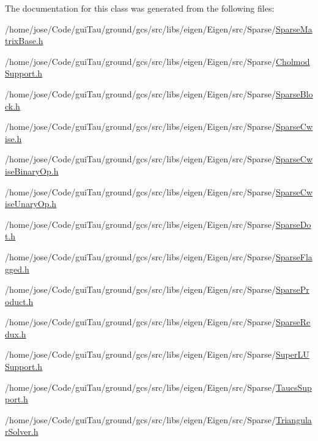 The documentation for this class was generated from the following files\-:\begin{DoxyCompactItemize}
\item 
/home/jose/\-Code/gui\-Tau/ground/gcs/src/libs/eigen/\-Eigen/src/\-Sparse/\hyperlink{_sparse_matrix_base_8h}{Sparse\-Matrix\-Base.\-h}\item 
/home/jose/\-Code/gui\-Tau/ground/gcs/src/libs/eigen/\-Eigen/src/\-Sparse/\hyperlink{_cholmod_support_8h}{Cholmod\-Support.\-h}\item 
/home/jose/\-Code/gui\-Tau/ground/gcs/src/libs/eigen/\-Eigen/src/\-Sparse/\hyperlink{_sparse_block_8h}{Sparse\-Block.\-h}\item 
/home/jose/\-Code/gui\-Tau/ground/gcs/src/libs/eigen/\-Eigen/src/\-Sparse/\hyperlink{_sparse_cwise_8h}{Sparse\-Cwise.\-h}\item 
/home/jose/\-Code/gui\-Tau/ground/gcs/src/libs/eigen/\-Eigen/src/\-Sparse/\hyperlink{_sparse_cwise_binary_op_8h}{Sparse\-Cwise\-Binary\-Op.\-h}\item 
/home/jose/\-Code/gui\-Tau/ground/gcs/src/libs/eigen/\-Eigen/src/\-Sparse/\hyperlink{_sparse_cwise_unary_op_8h}{Sparse\-Cwise\-Unary\-Op.\-h}\item 
/home/jose/\-Code/gui\-Tau/ground/gcs/src/libs/eigen/\-Eigen/src/\-Sparse/\hyperlink{_sparse_dot_8h}{Sparse\-Dot.\-h}\item 
/home/jose/\-Code/gui\-Tau/ground/gcs/src/libs/eigen/\-Eigen/src/\-Sparse/\hyperlink{_sparse_flagged_8h}{Sparse\-Flagged.\-h}\item 
/home/jose/\-Code/gui\-Tau/ground/gcs/src/libs/eigen/\-Eigen/src/\-Sparse/\hyperlink{_sparse_product_8h}{Sparse\-Product.\-h}\item 
/home/jose/\-Code/gui\-Tau/ground/gcs/src/libs/eigen/\-Eigen/src/\-Sparse/\hyperlink{_sparse_redux_8h}{Sparse\-Redux.\-h}\item 
/home/jose/\-Code/gui\-Tau/ground/gcs/src/libs/eigen/\-Eigen/src/\-Sparse/\hyperlink{_super_l_u_support_8h}{Super\-L\-U\-Support.\-h}\item 
/home/jose/\-Code/gui\-Tau/ground/gcs/src/libs/eigen/\-Eigen/src/\-Sparse/\hyperlink{_taucs_support_8h}{Taucs\-Support.\-h}\item 
/home/jose/\-Code/gui\-Tau/ground/gcs/src/libs/eigen/\-Eigen/src/\-Sparse/\hyperlink{_triangular_solver_8h}{Triangular\-Solver.\-h}\end{DoxyCompactItemize}
